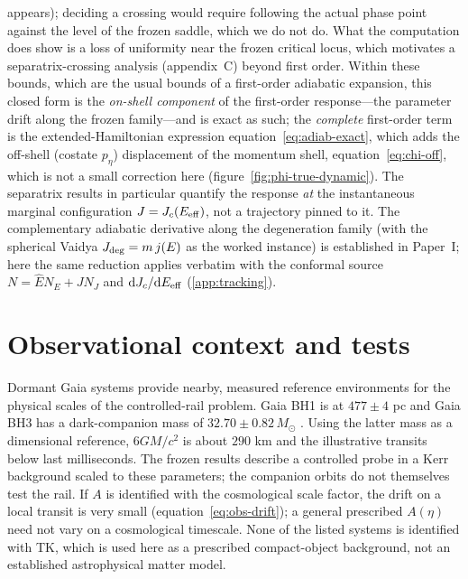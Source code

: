 \documentclass[12pt]{iopart}
\theoremstyle{plain}
\theoremstyle{definition}
\theoremstyle{remark}
\newcommand{\Ehat}{\hat E}
\newcommand{\Jc}{J_{c}}
\newcommand{\dd}{\mathrm{d}}
\begin{document}
appears); deciding a crossing would require following the actual phase point against the
level of the frozen saddle, which we do not do. What the computation does show is a loss
of uniformity near the frozen critical locus, which motivates a separatrix-crossing
analysis (appendix~C) beyond first order. Within these bounds, which
are the usual bounds of a first-order adiabatic expansion, this closed form is the \emph{on-shell
component} of the first-order response---the parameter drift along the frozen
family---and is exact as such; the \emph{complete} first-order term is the
extended-Hamiltonian expression equation~\eqref{eq:adiab-exact}, which adds the
off-shell (costate $p_\eta$) displacement of the momentum shell, equation~\eqref{eq:chi-off},
which is not a small correction here (figure~\ref{fig:phi-true-dynamic}). The separatrix results in particular
quantify the response \emph{at} the instantaneous marginal configuration
$J=\Jc(E_{\rm eff})$, not a trajectory pinned to it. The complementary
adiabatic derivative along the degeneration family
(with the spherical Vaidya $J_{\rm deg}=m\,j(E)$ as the worked instance) is established
in Paper~I; here the same reduction applies verbatim with the conformal source
$N=\Ehat N_E+J N_J$ and $\dd\Jc/\dd E_{\rm eff}$ (\ref{app:tracking}).



\section{Observational context and tests}
\label{sec:observational-context}

Dormant Gaia systems provide nearby, measured reference environments for
the physical scales of the controlled-rail problem. Gaia BH1 is at
$477\pm4$ pc and Gaia BH3 has a dark-companion mass of
$32.70\pm0.82\,M_\odot$ \cite{ElBadry2023BH1,Gaia2024BH3}.
Using the latter mass as a dimensional reference, $6GM/c^2$ is about
$290$ km and the illustrative transits below last milliseconds.
The frozen results describe a controlled probe in a Kerr background
scaled to these parameters; the companion orbits do not themselves
test the rail. If $A$ is identified with the cosmological scale factor,
the drift on a local transit is very small
(equation~\eqref{eq:obs-drift}); a general prescribed $A(\eta)$ need not
vary on a cosmological timescale. None of the listed systems is identified
with TK, which is used here as a prescribed compact-object background,
not an established astrophysical matter model.
\end{document}
